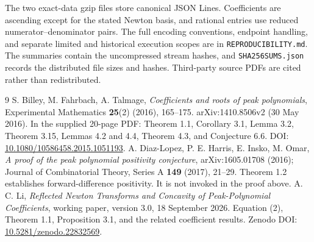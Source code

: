 \documentclass[11pt]{article}
\theoremstyle{definition}
\begin{document}
The two exact-data gzip files store canonical JSON Lines. Coefficients are
ascending except for the stated Newton basis, and rational entries use reduced
numerator--denominator pairs. The full encoding conventions, endpoint handling,
and separate limited and historical execution scopes are in
\texttt{REPRODUCIBILITY.md}. The summaries contain the uncompressed stream
hashes, and \texttt{SHA256SUMS.json} records the distributed file sizes and hashes.
Third-party source PDFs are cited rather than redistributed.

\begingroup\small
\begin{thebibliography}{9}
 S. Billey, M. Fahrbach, A. Talmage,
\emph{Coefficients and roots of peak polynomials}, Experimental Mathematics \textbf{25}(2) (2016), 165--175. arXiv:1410.8506v2 (30 May 2016). In the supplied 20-page PDF: Theorem 1.1, Corollary 3.1, Lemma 3.2, Theorem 3.15, Lemmas 4.2 and 4.4, Theorem 4.3, and Conjecture 6.6. DOI: \href{https://doi.org/10.1080/10586458.2015.1051193}{10.1080/10586458.2015.1051193}.
 A. Diaz-Lopez, P. E. Harris, E. Insko, M. Omar,
\emph{A proof of the peak polynomial positivity conjecture}, arXiv:1605.01708 (2016); Journal of Combinatorial Theory, Series A \textbf{149} (2017), 21--29. Theorem 1.2 establishes forward-difference positivity. It is not invoked in the proof above.
 A. C. Li,
\emph{Reflected Newton Transforms and Concavity of Peak-Polynomial Coefficients},
working paper, version 3.0, 18 September 2026.
Equation (2), Theorem 1.1, Proposition 3.1, and the related coefficient results.
Zenodo DOI: \href{https://doi.org/10.5281/zenodo.22832569}{10.5281/zenodo.22832569}.
\end{thebibliography}
\endgroup
\end{document}
